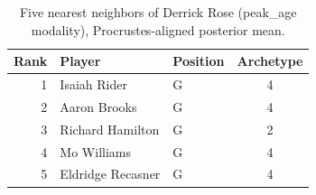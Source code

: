 \begin{table}[htbp]
  \centering\small
  \begin{tabular}{rllc}
    \toprule
    Rank & Player & Position & Archetype \\
    \midrule
    1 & Isaiah Rider & G & 4 \\
    2 & Aaron Brooks & G & 4 \\
    3 & Richard Hamilton & G & 2 \\
    4 & Mo Williams & G & 4 \\
    5 & Eldridge Recasner & G & 4 \\
    \bottomrule
  \end{tabular}
  \caption{Five nearest neighbors of Derrick Rose (peak_age modality), Procrustes-aligned posterior mean.}
  \label{tab:Derrick_Rose_neighbors_peak_age}
\end{table}

